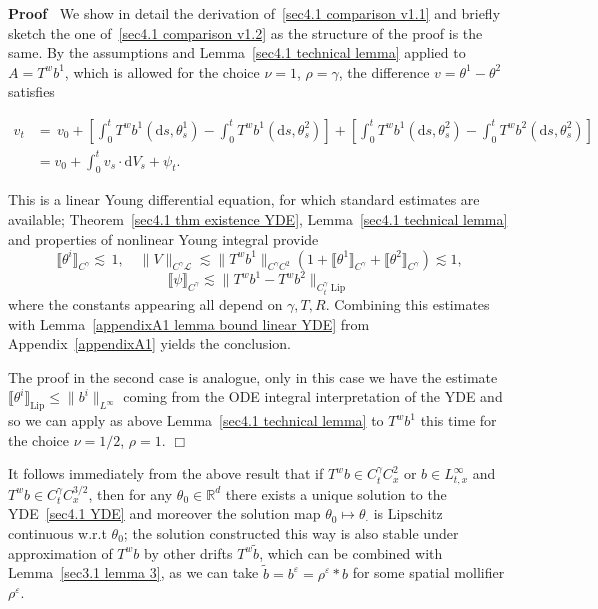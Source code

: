 \documentclass[10pt]{article}
\newcommand{\mathd}{\mathrm{d}}
\newcommand{\tmop}[1]{\ensuremath{\operatorname{#1}}}
\newenvironment{proof}{\noindent\textbf{Proof\ }}{\hspace*{\fill}$\Box$\medskip}
\begin{document}
\begin{proof}
  We show in detail the derivation of~{\eqref{sec4.1 comparison v1.1}} and
  briefly sketch the one of~{\eqref{sec4.1 comparison v1.2}} as the structure
  of the proof is the same. By the assumptions and Lemma~\ref{sec4.1 technical
  lemma} applied to $A = T^w b^1$, which is allowed for the choice $\nu = 1$,
  $\rho = \gamma$, the difference $v = \theta^1 - \theta^2$ satisfies
  
  \begin{align*}
    v_t & = \, v_0 + \left[ \int_0^t T^w b^1 (\mathd s, \theta^1_s) - \int_0^t
    T^w b^1 (\mathd s, \theta^2_s) \right] + \left[ \int_0^t T^w b^1 (\mathd
    s, \theta^2_s) - \int_0^t T^w b^2 (\mathd s, \theta^2_s) \right]\\
    & = v_0 + \int_0^t v_s \cdot \mathd V_s + \psi_t .
  \end{align*}
  
  This is a linear Young differential equation, for which standard estimates
  are available; Theorem~\ref{sec4.1 thm existence YDE}, Lemma~\ref{sec4.1
  technical lemma} and properties of nonlinear Young integral provide
  \[ \llbracket \theta^i \rrbracket_{C^{\gamma}} \lesssim \, 1, \quad \| V
     \|_{C^{\gamma} \mathcal{L}} \lesssim \| T^w b^1 \|_{C^{\gamma} C^2} (1 +
     \llbracket \theta^1 \rrbracket_{C^{\gamma}} + \llbracket \theta^2
     \rrbracket_{C^{\gamma}}) \lesssim 1, \]
  \[ \llbracket \psi \rrbracket_{C^{\gamma}} \lesssim \| T^w b^1 - T^w b^2
     \|_{C^{\gamma}_t \tmop{Lip}} \]
  where the constants appearing all depend on $\gamma, T, R$. Combining this
  estimates with Lemma~\ref{appendixA1 lemma bound linear YDE} from
  Appendix~\ref{appendixA1} yields the conclusion.
  
  The proof in the second case is analogue, only in this case we have the
  estimate $\llbracket \theta^i \rrbracket_{\tmop{Lip}} \leqslant \| b^i
  \|_{L^{\infty}}$ coming from the ODE integral interpretation of the YDE and
  so we can apply as above Lemma~\ref{sec4.1 technical lemma} to $T^w b^1$
  this time for the choice $\nu = 1 / 2$, $\rho = 1$.
\end{proof}

\begin{remark}
  It follows immediately from the above result that if $T^w b \in C^{\gamma}_t
  C_x^2$ or $b \in L^{\infty}_{t, x}$ and $T^w b \in C^{\gamma}_t C^{3 /
  2}_x$, then for any $\theta_0 \in \mathbb{R}^d$ there exists a unique
  solution to the YDE~{\eqref{sec4.1 YDE}} and moreover the solution map
  $\theta_0 \mapsto \theta_{\cdot}$ is Lipschitz continuous w.r.t $\theta_0$;
  the solution constructed this way is also stable under approximation of $T^w
  b$ by other drifts $T^w \tilde{b}$, which can be combined with
  Lemma~\ref{sec3.1 lemma 3}, as we can take $\tilde{b} = b^{\varepsilon} =
  \rho^{\varepsilon} \ast b$ for some spatial mollifier $\rho^{\varepsilon}$.
\end{remark}
\end{document}
